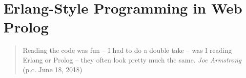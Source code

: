 \documentclass{tlp}
\begin{document}
%
%
%
%
%
%
%


\section{Erlang-Style Programming in Web Prolog}\label{sec:language}

\begin{quote}
Reading the code was fun -- I had to do a double take -- was I reading Erlang or Prolog -- they often look pretty much the same. \flushright \textit{Joe Armstrong} (p.c. June 18, 2018)
\end{quote}
\end{document}
